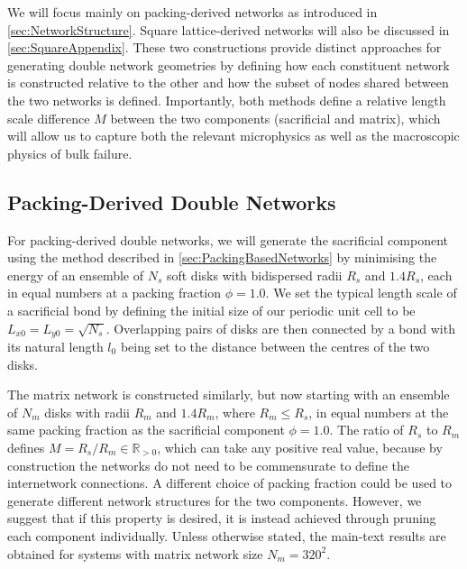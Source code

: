 We will focus mainly on packing-derived networks as introduced in \cref{sec:NetworkStructure}. Square lattice-derived networks will also be discussed in \cref{sec:SquareAppendix}. These two constructions provide distinct approaches for generating double network geometries by defining how each constituent network is constructed relative to the other and how the subset of nodes shared between the two networks is defined. Importantly, both methods define a relative length scale difference $M$ between the two components (sacrificial and matrix), which will allow us to capture both the relevant microphysics as well as the macroscopic physics of bulk failure. 

\subsection{Packing-Derived Double Networks}
For packing-derived double networks, we will generate the sacrificial component using the method described in \cref{sec:PackingBasedNetworks} by minimising the energy of an ensemble of $N_s$ soft disks with bidispersed radii $R_s$ and $1.4R_s$, each in equal numbers at a packing fraction $\phi = 1.0$. We set the typical length scale of a sacrificial bond by defining the initial size of our periodic unit cell to be $L_{x0} = L_{y0} = \sqrt{N_s}$. Overlapping pairs of disks are then connected by a bond with its natural length $l_0$ being set to the distance between the centres of the two disks. 

The matrix network is constructed similarly, but now starting with an ensemble of $N_m$ disks with radii $R_m$ and $1.4R_m$, where $R_m \leq R_s$, in equal numbers at the same packing fraction as the sacrificial component $\phi = 1.0$. The ratio of $R_s$ to $R_m$ defines $M = R_s / R_m \in \mathbb{R}_{>0}$, which can take any positive real value, because by construction the networks do not need to be commensurate to define the internetwork connections. A different choice of packing fraction could be used to generate different network structures for the two components. However, we suggest that if this property is desired, it is instead achieved through pruning each component individually. Unless otherwise stated, the main-text results are obtained for systems with matrix network size $N_m = 320^2$.

